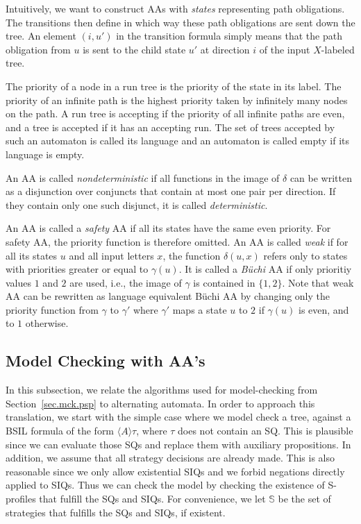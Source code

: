 \documentclass[11pt]{article}
\newcommand{\bbbbs}{{\mathbb S}}
\begin{document}
Intuitively, we want to 
construct AAs with {\em states} representing path obligations.  
The transitions then define in which way these path obligations 
are sent down the tree.  
An element $(i,u')$ in the transition formula 
simply means that the path obligation from $u$ is sent to 
the child state $u'$ at direction $i$ of the input $X$-labeled tree.  

The priority of a node in a run tree is the priority of 
the state in its label.
The priority of an infinite path is the highest priority taken by infinitely many nodes on the path.
A run tree is accepting if the priority of all infinite paths are even, and a tree is accepted if it has an accepting run.
The set of trees accepted by such an automaton is called its language and an automaton is called empty if its language is empty.

An AA is called {\em nondeterministic} 
if all functions in the image of $\delta$ 
can be written as a disjunction over conjuncts 
that contain at most one pair per direction.
If they contain only one such disjunct, 
it is called {\em deterministic}.

An AA is called a \emph{safety} AA if all its states have 
the same even priority.  
For safety AA, the priority function is therefore omitted.
An AA is called \emph{weak} if for all its states $u$ 
and all input letters $x$, 
the function $\delta(u,x)$ refers only to states with priorities greater 
or equal to $\gamma(u)$.  
It is called a \emph{B\"uchi} AA if only prioritiy values $1$ and $2$ 
are used, i.e., the image of $\gamma$ 
is contained in $\{1,2\}$.  
Note that weak AA can be rewritten as language equivalent B\"uchi AA 
by changing only the priority function from $\gamma$ to $\gamma'$ 
where $\gamma'$ maps a state $u$ to $2$ if $\gamma(u)$ is even, and 
to $1$ otherwise. 




\subsection{Model Checking with AA's}

In this subsection, we relate the algorithms 
used for model-checking from Section~\ref{sec.mck.psp} 
to alternating automata.
In order to approach this translation, 
we start with the simple case where we model check a tree, 
against a BSIL formula of the form $\langle A \rangle \tau$, 
where $\tau$ does not contain an SQ.  
This is plausible since we can evaluate those SQs and replace them 
with auxiliary propositions.  
In addition, we assume that all strategy decisions are already made.  
This is also reasonable since we only allow existential SIQs and 
we forbid negations directly applied to SIQs.  
Thus we can check the model by checking the existence of S-profiles that 
fulfill the SQs and SIQs.  
For convenience, we let $\bbbbs$ be the set of strategies that 
fulfills the SQs and SIQs, if existent. 
\end{document}
